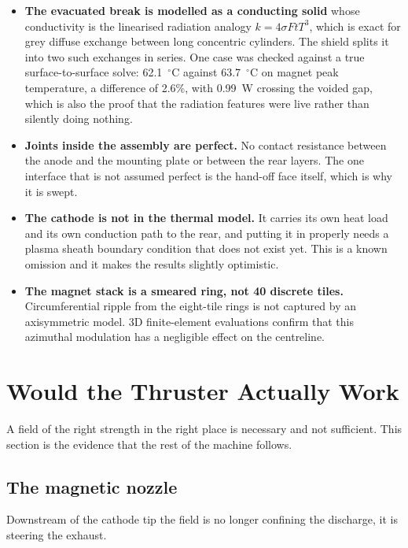 \documentclass[11pt,a4paper]{article}
\newcommand{\degC}{$^\circ$C}
\begin{document}
\begin{itemize}[itemsep=3pt]
  \item \textbf{The evacuated break is modelled as a conducting solid} whose
        conductivity is the linearised radiation analogy
        $k = 4\sigma F t T^3$, which is exact for grey diffuse exchange between
        long concentric cylinders. The shield splits it into two such exchanges
        in series. One case was checked against a true surface-to-surface
        solve: 62.1~\degC{} against 63.7~\degC{} on magnet peak temperature, a
        difference of 2.6\%, with 0.99~W crossing the voided gap, which is also
        the proof that the radiation features were live rather than silently
        doing nothing.
  \item \textbf{Joints inside the assembly are perfect.} No contact resistance
        between the anode and the mounting plate or between the rear layers.
        The one interface that is not assumed perfect is the hand-off face
        itself, which is why it is swept.
  \item \textbf{The cathode is not in the thermal model.} It carries its own
        heat load and its own conduction path to the rear, and putting it in
        properly needs a plasma sheath boundary condition that does not exist
        yet. This is a known omission and it makes the results slightly
        optimistic.
  \item \textbf{The magnet stack is a smeared ring, not 40 discrete tiles.}
        Circumferential ripple from the eight-tile rings is not captured by an
        axisymmetric model. 3D finite-element evaluations confirm that this azimuthal modulation has a
        negligible effect on the centreline.
\end{itemize}

\section{Would the Thruster Actually Work}
\label{sec:system}

A field of the right strength in the right place is necessary and not
sufficient. This section is the evidence that the rest of the machine follows.

\subsection{The magnetic nozzle}
Downstream of the cathode tip the field is no longer confining the discharge,
it is steering the exhaust.
\end{document}
